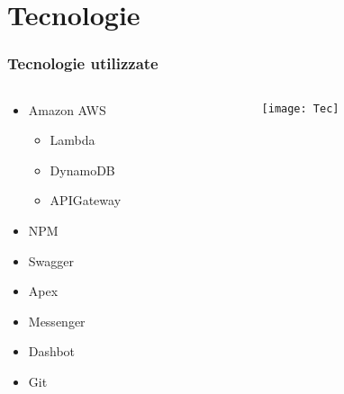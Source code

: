 
\section{Tecnologie}
\begin{frame}

  \frametitle{Tecnologie utilizzate}

  \begin{columns}
    \begin{column}{0.5\textwidth}
      
      \begin{itemize}
      \item Amazon AWS
        \begin{itemize}
        \item Lambda
        \item DynamoDB
        \item APIGateway
        \end{itemize}
      \item NPM
      \item Swagger
      \item Apex
      \item Messenger
      \item Dashbot
      \item Git
      \end{itemize}
    \end{column}
    \begin{column}{0.5\textwidth}
      \begin{figure}
        \centering
        \texttt{[image: Tec]}
      \end{figure}
    \end{column}
  \end{columns}

  
\end{frame}
